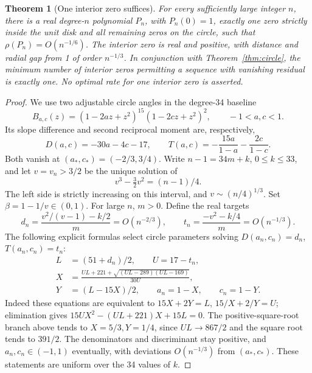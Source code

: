 \documentclass[11pt]{article}
\newtheorem{theorem}{Theorem}
\theoremstyle{remark}\newtheorem{remark}[theorem]{Remark}
\begin{document}
\begin{theorem}[One interior zero suffices]\label{thm:one}
For every sufficiently large integer \(n\), there is a real
degree-\(n\) polynomial \(P_n\), with \(P_n(0)=1\), exactly one
zero strictly inside the unit disk and all remaining zeros on the
circle, such that \(\rho(P_n)=O(n^{-1/6})\).
The interior zero is real and positive, with distance and radial gap
from 1 of order \(n^{-1/3}\). In conjunction with
Theorem~\ref{thm:circle}, the minimum number of interior zeros
permitting a sequence with vanishing residual is exactly one.
No optimal rate for one interior zero is asserted.
\end{theorem}
\begin{proof}
We use two adjustable circle angles in the degree-34 baseline
\[
 B_{a,c}(z)=(1-2az+z^2)^{15}(1-2cz+z^2)^2,
 \qquad -1<a,c<1.
\]
Its slope difference and second reciprocal moment are, respectively,
\[
 D(a,c)=-30a-4c-17,\qquad
 T(a,c)=-\frac{15a}{1-a}-\frac{2c}{1-c}.
\]
Both vanish at \((a_*,c_*)=(-2/3,3/4)\). Write
\(n-1=34m+k\), \(0\le k\le33\), and let \(v=v_n>3/2\)
be the unique solution of
\begin{equation}\label{eq:single-cubic}
 v^3-\tfrac32v^2=(n-1)/4.
\end{equation}
The left side is strictly increasing on this interval, and
\(v\sim(n/4)^{1/3}\). Set \(\beta=1-1/v\in(0,1)\).
For large \(n\), \(m>0\). Define the real targets
\[
 d_n=\frac{v^2/(v-1)-k/2}{m}=O(n^{-2/3}),\qquad
 t_n=\frac{-v^2-k/4}{m}=O(n^{-1/3}).
\]
The following explicit formulas select circle parameters solving
\(D(a_n,c_n)=d_n\), \(T(a_n,c_n)=t_n\):
\begin{align*}
 L&=(51+d_n)/2,\qquad U=17-t_n,\\
 X&=\frac{UL+221+\sqrt{(UL-289)(UL-169)}}{30U},\\
 Y&=(L-15X)/2,\qquad a_n=1-X,\qquad c_n=1-Y.
\end{align*}
Indeed these equations are equivalent to
\(15X+2Y=L\), \(15/X+2/Y=U\); elimination gives
\(15UX^2-(UL+221)X+15L=0\). The positive-square-root branch
above tends to \(X=5/3,Y=1/4\), since
\(UL\to867/2\) and the square root tends to \(391/2\).
The denominators and discriminant stay positive, and
\(a_n,c_n\in(-1,1)\) eventually, with deviations
\(O(n^{-1/3})\) from \((a_*,c_*)\). These statements are
uniform over the 34 values of \(k\).


\end{proof}
\end{document}
